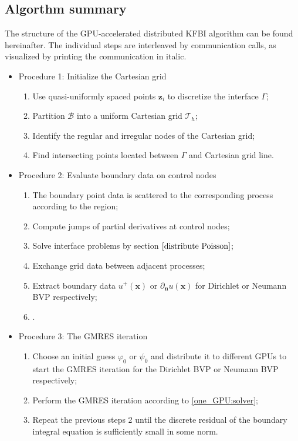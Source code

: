 \subsection{Algorthm summary}\label{Sec:Algorthm summary}
The structure of the GPU-accelerated distributed KFBI algorithm can be found hereinafter. The
individual steps are interleaved by communication calls, as
visualized by printing the communication in italic.

\begin{itemize}
    \item Procedure 1: Initialize the Cartesian grid 
    \begin{enumerate}
        \item Use quasi-uniformly spaced points $\textbf{z}_{i}$ to discretize the interface $\Gamma$;
        \item Partition $\mathcal{B}$ into a uniform Cartesian grid $\mathcal{T}_{h}$;
        \item Identify the regular and irregular nodes of the Cartesian grid;
        \item Find intersecting points located between $\Gamma$ and Cartesian grid line.
    \end{enumerate}
    \item Procedure 2: Evaluate boundary data on control nodes
    \begin{enumerate}   
        \item The boundary point data is scattered to the corresponding process according to the region;
        \item Compute jumps of partial derivatives at control nodes;
        \item Solve interface problems by section $\ref{distribute Poisson}$;
        \item Exchange grid data between adjacent processes;
        \item Extract boundary data $u^{+}(\textbf{x})$ or $\partial_{\textbf{n}} u(\textbf{x})$ for Dirichlet or Neumann BVP respectively;
        \item {}.
    \end{enumerate}
    \item Procedure 3: The GMRES iteration
    \begin{enumerate}
        \item Choose an initial guess $\varphi_0$ or $\psi_0$ and distribute it to different GPUs to start the GMRES iteration for the Dirichlet BVP or Neumann BVP respectively;
        \item Perform the GMRES iteration according to \ref{one_GPU:solver};
        \item Repeat the previous steps 2 until the discrete residual of the boundary integral equation is sufficiently small in some norm.
    \end{enumerate}
    \label{time-dependence solver}
\end{itemize}
